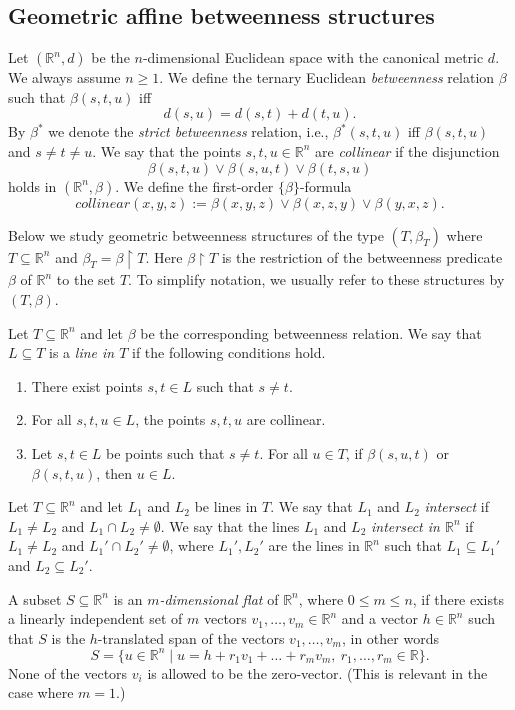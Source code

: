 \documentclass{LMCS}
\theoremstyle{plain}
\newcommand{\rp}{(\mathbb{R}^n,\beta)}
\newcommand{\rsq}{\mathbb{R}^n}
\begin{document}
\subsection{Geometric affine betweenness structures}\label{structures}
%
%
Let $(\rsq, d)$ be the $n$-dimensional Euclidean space with the canonical metric $d$.
%
We always assume $n\geq 1$. We define the
%
ternary Euclidean \emph{betweenness} relation $\beta$ such that $\beta(s,t,u)$ iff 
\[
d(s,u)=d(s,t)+d(t,u).
\]
By $\beta^*$ we
%
denote the \emph{strict betweenness} relation, i.e., $\beta^*(s,t,u)$ iff  $\beta(s,t,u)$ and $s\not=t\not=u$.
%
We say that the points $s,t,u\in\mathbb{R}^n$ are \emph{collinear} if the 
%
disjunction
\[
\beta(s,t,u)\vee \beta(s,u,t)\vee \beta(t,s,u)
\]
holds in $\rp$.
%
We define the first-order $\{\beta\}$-formula
%
%
\[
collinear(x,y,z):=\beta(x,y,z)\vee\beta(x,z,y)\vee\beta(y,x,z).
\]
%
%

Below we study geometric betweenness structures of the type $(T,\beta_T)$ where $T\subseteq\mathbb{R}^n$ and $\beta_T=\beta\upharpoonright T$.
%
Here $\beta\upharpoonright T$ is the restriction of the betweenness predicate $\beta$ of $\mathbb{R}^n$ to the set $T$.
%
To simplify notation, we usually refer to these structures by $(T,\beta)$.
%



%
Let $T\subseteq\rsq$ and let $\beta$ be the corresponding betweenness relation.
We say that $L\subseteq T$ is a \emph{line in $T$} if
the following conditions hold.
%
%
%
\begin{enumerate}
\item
There exist points $s,t\in L$ such that $s\not= t$.
%
\item
For all $s,t,u\in L$, the points $s,t,u$ are collinear.
\item
Let  $s,t\in L$ be points such that $s\not=t$. For all $u\in T$, if $\beta(s,u,t)$ or $\beta(s,t,u)$, then $u\in L$.
\end{enumerate}
%



%
Let $T\subseteq\rsq$ and let $L_1$ and $L_2$ be lines in $T$. We say that $L_1$ and $L_2$
\emph{intersect} if $L_1\not=L_2$ and $L_1\cap L_2\neq\emptyset$. We say that the lines $L_1$ and $L_2$
\emph{intersect in $\rsq$} if $L_1\not=L_2$ and $L_1'\cap L_2'\neq\emptyset$, 
where $L_1',L_2'$ are the lines in $\rsq$ such that $L_1\subseteq L_1'$ and $L_2\subseteq L_2'$.
%



%
A subset $S\subseteq\mathbb{R}^n$ is an \emph{$m$-dimensional flat} of $\mathbb{R}^n$, where $0\leq m\leq n$, if there exists a linearly 
%
independent set of
%
$m$ vectors $v_1,\dots,v_m\in\mathbb{R}^n$ and a vector $h\in \rsq$ such that $S$ is
%
the $h$-translated span of the vectors $v_1,\dots,v_m$,
%
in other words
\[
S=\{u\in\rsq\mid u=h + r_1 v_1 + \dots +r_m v_m,\ r_1,\dots,r_m\in\mathbb{R}\}.
\]
%
None of the vectors $v_i$ is allowed to be the zero-vector. (This is relevant
%
in the case where $m=1$.)
%
\end{document}
